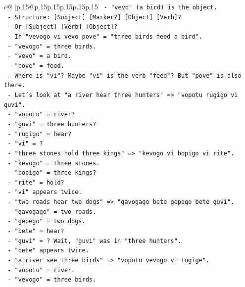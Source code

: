 \documentclass{article}
\begin{document}
{\begin{supertabular}{c@{$\;$}|p{.15\linewidth}@{}p{.15\linewidth}p{.15\linewidth}p{.15\linewidth}p{.15\linewidth}p{.15\linewidth}}
{{{\texttt{      {-} "vevo" (a bird) is the object.} \\
\texttt{      {-} Structure: {[}Subject{]} {[}Marker?{]} {[}Object{]} {[}Verb{]}?} \\
\texttt{      {-} Or {[}Subject{]} {[}Verb{]} {[}Object{]}?} \\
\texttt{      {-} If "vevogo vi vevo pove" = "three birds feed a bird".} \\
\texttt{      {-} "vevogo" = three birds.} \\
\texttt{      {-} "vevo" = a bird.} \\
\texttt{      {-} "pove" = feed.} \\
\texttt{      {-} Where is "vi"? Maybe "vi" is the verb "feed"? But "pove" is also there.} \\
\texttt{      {-} Let's look at "a river hear three hunters" => "vopotu rugigo vi guvi".} \\
\texttt{        {-} "vopotu" = river?} \\
\texttt{        {-} "guvi" = three hunters?} \\
\texttt{        {-} "rugigo" = hear?} \\
\texttt{        {-} "vi" = ?} \\
\texttt{      {-} "three stones hold three kings" => "kevogo vi bopigo vi rite".} \\
\texttt{        {-} "kevogo" = three stones.} \\
\texttt{        {-} "bopigo" = three kings?} \\
\texttt{        {-} "rite" = hold?} \\
\texttt{        {-} "vi" appears twice.} \\
\texttt{      {-} "two roads hear two dogs" => "gavogago bete gepego bete guvi".} \\
\texttt{        {-} "gavogago" = two roads.} \\
\texttt{        {-} "gepego" = two dogs.} \\
\texttt{        {-} "bete" = hear?} \\
\texttt{        {-} "guvi" = ? Wait, "guvi" was in "three hunters".} \\
\texttt{        {-} "bete" appears twice.} \\
\texttt{      {-} "a river see three birds" => "vopotu vevogo vi tugige".} \\
\texttt{        {-} "vopotu" = river.} \\
\texttt{        {-} "vevogo" = three birds.} \\
}}}
\end{supertabular}}
\end{document}
